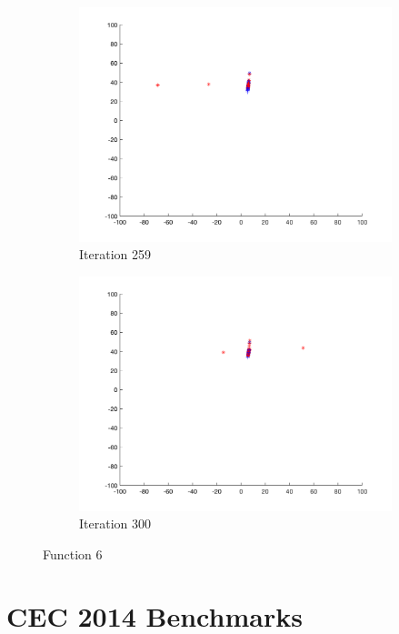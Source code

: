 \begin{figure}
\begin{subfigure}[b]{0.4\textwidth}
    \includegraphics[width=\textwidth]{img/smpl/rosn2d-9-100/loa-iter-259}
    \caption{Iteration 259}
    \label{fig:s6-iter-6}
  \end{subfigure}
  \begin{subfigure}[b]{0.4\textwidth}
    \includegraphics[width=\textwidth]{img/smpl/rosn2d-9-100/loa-iter-300}
    \caption{Iteration 300}
    \label{fig:s6-iter-7}
  \end{subfigure}
  \caption{Function 6}
\end{figure}

\clearpage

\section{CEC 2014 Benchmarks}

